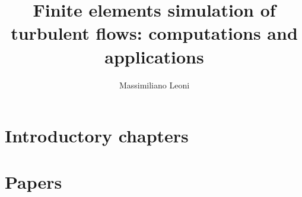\documentclass[a4paper,openright]{book}
\title{Finite elements simulation of turbulent flows: computations and
applications}
\author{Massimiliano Leoni}
\date{}
\newcommand{\<}{\langle}
\renewcommand{\>}{\rangle}
\theoremstyle{definition}					%
\theoremstyle{plain}
\begin{document}
  \frontmatter
  \maketitle

  \tableofcontents

  \mainmatter

  \part{Introductory chapters}
  
  
  
  
  

  \part{Papers}

  \backmatter
  \printbibliography[heading=bibintoc]
\end{document}
